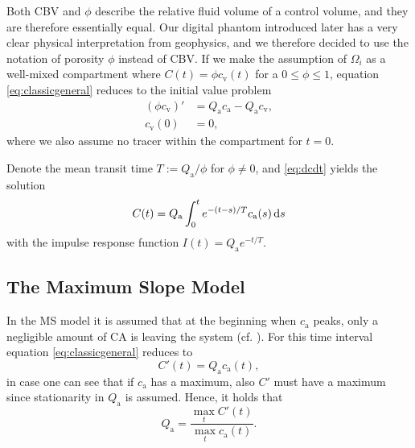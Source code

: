 \documentclass[paper=a4, fontsize=11pt,parskip=half,headings=small]{scrartcl}
\newcommand{\ca}{c_\mathrm{a}}
\newcommand{\cout}{c_{\mathrm{v}}}
\newcommand{\Pa}{Q_{\mathrm{a}}}
\begin{document}

Both CBV and $\phi$ describe the relative fluid volume of a control volume, and they are therefore essentially equal. Our digital phantom introduced later has a very clear physical interpretation from geophysics, and we therefore decided to use the notation of porosity $\phi$ instead of CBV. If we make the assumption of $\Omega_i$ as a well-mixed compartment where $C(t) = \phi\cout(t)$ for a $0 \le \phi \le 1$, equation \eqref{eq:classicgeneral} reduces to the initial value problem
	\begin{align}
		(\phi \cout)' &= \Pa \ca - \Pa \cout, \nonumber \\
		\cout(0)&=0,
		\label{eq:dcdt}
	\end{align}
	where we also assume no tracer within the compartment for $t = 0$. 
	
	Denote the mean transit time $T:=\Pa/ \phi$ for $\phi \ne 0$, and \eqref{eq:dcdt} yields the solution
	\begin{equation}
		C(t) = \Pa \int_0^t e^{-(t-s)/T}\ca(s)\diffint s
		\label{eq:classicalperf}
	\end{equation}
	with the impulse response function $I(t)=\Pa e^{-t/T}$. 

	
	
	
	\subsection{The Maximum Slope Model}\label{sec:ms}	
	In the MS model it is assumed that at the beginning when $\ca$ peaks, only a negligible amount of CA is leaving the system (cf. \cite{klotz99}).
	For this time interval equation \eqref{eq:classicgeneral} reduces to 
	\begin{equation}
		C'(t) = \Pa\ca(t),
	\end{equation}
	in case one can see that if $\ca$ has a maximum, also $C'$ must have a maximum since stationarity in $\Pa$ is assumed.
	Hence, it holds that
	\begin{equation}\label{eq:MS}
		\Pa = \frac{\max_{t}C'(t)}{\max_{t}\ca(t)}.
	\end{equation}
	
\end{document}
